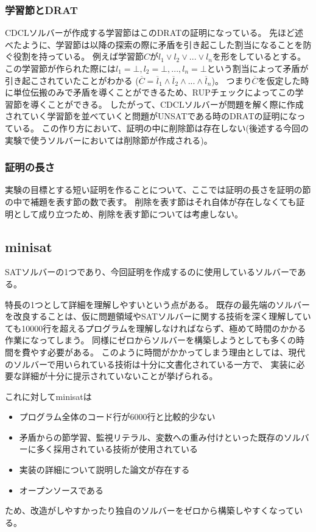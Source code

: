 \documentclass[titlepage]{jsarticle}
\begin{document}
\subsubsection{学習節とDRAT}
CDCLソルバーが作成する学習節はこのDRATの証明になっている。
先ほど述べたように、学習節は以降の探索の際に矛盾を引き起こした割当になることを防ぐ役割を持っている。
例えば学習節$C$が$l_1 \lor l_2 \lor ... \lor l_n$を形をしているとする。
この学習節が作られた際には$l_1=\bot, l_2=\bot, ... , l_n=\bot$という割当によって矛盾が引き起こされていたことがわかる
($\overline C = \overline l_1 \land \overline l_2 \land ... \land \overline l_n$)。
つまり$\overline C$を仮定した時に単位伝搬のみで矛盾を導くことができるため、RUPチェックによってこの学習節を導くことができる。
したがって、CDCLソルバーが問題を解く際に作成されていく学習節を並べていくと問題がUNSATである時のDRATの証明になっている。
この作り方において、証明の中に削除節は存在しない(後述する今回の実験で使うソルバーにおいては削除節が作成される)。



\subsubsection{証明の長さ}
実験の目標とする短い証明を作ることについて、ここでは証明の長さを証明の節の中で補題を表す節の数で表す。
削除を表す節はそれ自体が存在しなくても証明として成り立つため、削除を表す節については考慮しない。





\subsection{minisat}



SATソルバーの1つであり、今回証明を作成するのに使用しているソルバーである。

特長の1つとして詳細を理解しやすいという点がある。
既存の最先端のソルバーを改良することは、仮に問題領域やSATソルバーに関する技術を深く理解していても10000行を超えるプログラムを理解しなければならず、極めて時間のかかる作業になってしまう。
同様にゼロからソルバーを構築しようとしても多くの時間を費やす必要がある。
このように時間がかかってしまう理由としては、現代のソルバーで用いられている技術は十分に文書化されている一方で、
実装に必要な詳細が十分に提示されていないことが挙げられる。

これに対してminisatは
\begin{itemize}
	\item プログラム全体のコード行が6000行と比較的少ない
	\item 矛盾からの節学習、監視リテラル、変数への重み付けといった既存のソルバーに多く採用されている技術が使用されている
	\item 実装の詳細について説明した論文が存在する
	\item オープンソースである
\end{itemize}
ため、改造がしやすかったり独自のソルバーをゼロから構築しやすくなっている。
\end{document}
